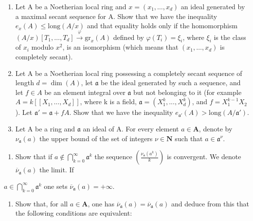 \begin{enumerate}
\def\labelenumi{\arabic{enumi})}
\setcounter{enumi}{15}
\item
  Let A be a Noetherian local ring and \(x = (x_1, \ldots, x_d)\) an ideal generated by a maximal secant sequence for A. Show that we have the inequality \(e_x(A) \leqslant \text{long}(A/x)\) and that equality holds only if the homomorphism \((A/x)[T_1, \ldots, T_d] \xrightarrow{\varphi} \text{gr}_x(A)\) defined by \(\varphi(T_i) = \xi_i\), where \(\xi_i\) is the class of \(x_i\) modulo \(x^2\), is an isomorphism (which means that \((x_1, \ldots, x_d)\) is completely secant).
\item
  Let A be a Noetherian local ring possessing a completely secant sequence of length \(d = \dim(A)\), let \(\mathfrak{a}\) be the ideal generated by such a sequence, and let \(f \in A\) be an element integral over \(\mathfrak{a}\) but not belonging to it (for example \(A = k[[X_1, ..., X_d]]\), where k is a field, \(\mathfrak{a} = (X_1^k, ..., X_d^k)\), and \(f = X_1^{k-1}X_2\)). Let \(\mathfrak{a}' = \mathfrak{a} + fA\). Show that we have the inequality \(e_{\mathfrak{a}'}(A) > \text{long}(A/\mathfrak{a}')\).
\item
  Let A be a ring and \(\mathfrak{a}\) an ideal of A. For every element \(a \in \mathbf{A}\), denote by \(\nu_{\mathfrak{a}}(a)\) the upper bound of the set of integers \(\nu \in \mathbf{N}\) such that \(a \in \mathfrak{a}^{\nu}\).
\end{enumerate}

\begin{enumerate}
\def\labelenumi{\alph{enumi})}
\tightlist
\item
  Show that if \(a \notin \bigcap_{k=0}^{\infty} \mathfrak{a}^k\) the sequence \(\left(\frac{\nu_{\mathfrak{a}}(a^k)}{k}\right)\) is convergent. We denote \(\overline{\nu}_{\mathfrak{a}}(a)\) the limit. If
\end{enumerate}

\(a \in \bigcap_{k=0}^{\infty} \mathfrak{a}^{k}\) one sets \(\overline{\nu}_{\mathfrak{a}}(a) = +\infty\).

\begin{enumerate}
\def\labelenumi{\alph{enumi})}
\setcounter{enumi}{1}
\tightlist
\item
  Show that, for all \(a \in \mathbf{A}\), one has \(\overline{\nu}_{\mathfrak{a}}(a) = \overline{\nu}_{\mathfrak{a}}(a)\) and deduce from this that the following conditions are equivalent:
\end{enumerate}

